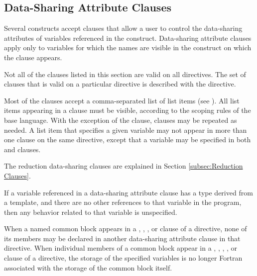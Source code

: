\subsection{Data-Sharing Attribute Clauses}
\label{subsec:Data-Sharing Attribute Clauses}
Several constructs accept clauses that allow a user to control the data-sharing attributes
of variables referenced in the construct. Data-sharing attribute clauses apply only to
variables for which the names are visible in the construct on which the clause appears.

Not all of the clauses listed in this section are valid on all directives. The set of clauses
that is valid on a particular directive is described with the directive.

Most of the clauses accept a comma-separated list of list items (see
).
All list items appearing in a clause must be visible, according to the scoping rules
of the base language. With the exception of the  clause, clauses may be
repeated as needed. A list item that specifies a given variable may not appear in more
than one clause on the same directive, except that a variable may be specified in both
 and  clauses.

The reduction data-sharing clauses are explained in Section \ref{subsec:Reduction Clauses}.

\begin{cppspecific}
If a variable referenced in a data-sharing attribute clause has a type derived from a
template, and there are no other references to that variable in the program, then any
behavior related to that variable is unspecified.
\end{cppspecific}
%
\begin{fortranspecific}
When a named common block appears in a , ,
, or  clause of a directive, none of its members may be declared
in another data-sharing attribute clause in that directive. When individual members of a common block appear in a , ,
, , or  clause of a directive, the storage of the specified variables is no longer Fortran associated with the storage of the common block itself.
\end{fortranspecific}










